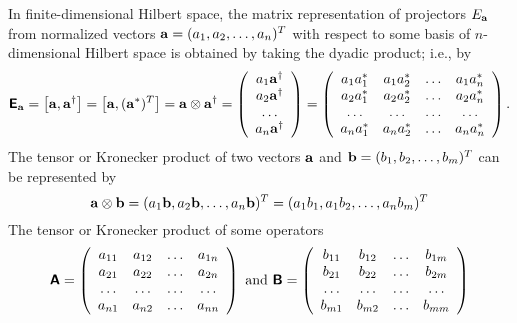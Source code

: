 {In finite-dimensional Hilbert space, the matrix representation of projectors $E_{\bf a}$
from normalized vectors ${\bf a}=(a_1,a_2,\ldots ,a_n)^T$ with respect to some basis of $n$-dimensional Hilbert space
is obtained by taking the dyadic product; i.e., by
\begin{equation}
\textsf{\textbf{E}}_{\bf a}= \left[{\bf a},{\bf a}^\dagger\right]=\left[{\bf a},({\bf a}^\ast)^T\right]=
{\bf a}\otimes {\bf a}^\dagger =
\left(
\begin{array}{cccccccccc}
a_1{\bf a}^\dagger \\
a_2{\bf a}^\dagger \\
\ldots  \\
a_n{\bf a}^\dagger
\end{array}
\right)
=
\left(
\begin{array}{cccccccccc}
a_1a_1^\ast & a_1a_2^\ast & \ldots & a_1a_n^\ast \\
a_2a_1^\ast & a_2a_2^\ast & \ldots & a_2a_n^\ast \\
\ldots & \ldots & \ldots & \ldots \\
a_na_1^\ast & a_na_2^\ast & \ldots & a_na_n^\ast
\end{array}
\right)
.
\end{equation}
The tensor or Kronecker product of two vectors ${\bf a}$ and ${\bf b} =(b_1,b_2,\ldots ,b_m)^T$ can be represented by
\begin{equation}
{\bf a} \otimes {\bf b} = (a_1{\bf b},a_2{\bf b},\ldots ,a_n{\bf b})^T = (a_1b_1,a_1b_2,\ldots ,a_nb_m)^T
\end{equation}
The tensor or Kronecker product of some operators
\begin{equation}
\textsf{\textbf{A}}=
\left(
\begin{array}{cccccccccc}
a_{11} & a_{12} & \ldots & a_{1n} \\
a_{21} & a_{22} & \ldots & a_{2n} \\
\ldots & \ldots & \ldots & \ldots \\
a_{n1} & a_{n2} & \ldots & a_{nn}
\end{array}
\right)
\textrm{ and  }\textsf{\textbf{B}}=
\left(
\begin{array}{cccccccccc}
b_{11} & b_{12} & \ldots & b_{1m} \\
b_{21} & b_{22} & \ldots & b_{2m} \\
\ldots & \ldots & \ldots & \ldots \\
b_{m1} & b_{m2} & \ldots & b_{mm}
\end{array}
\right)
\end{equation}
}
